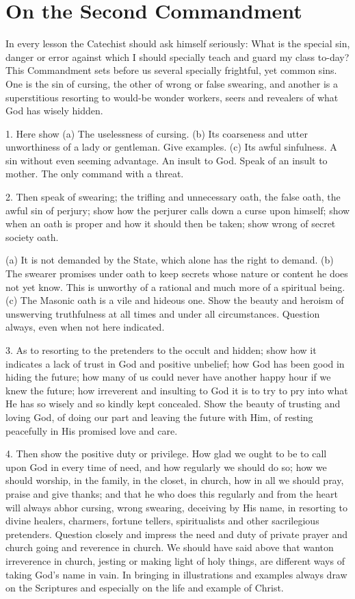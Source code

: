 \section{On the Second Commandment}

In every lesson the Catechist should ask himself seriously: What is the special sin, danger or error against which I should specially teach and guard my class to-day? This Commandment sets before us several specially frightful, yet common sins. One is the sin of cursing, the other of wrong or false swearing, and another is a superstitious resorting to would-be wonder workers, seers and revealers of what God has wisely hidden.

 1. Here show (a) The uselessness of cursing. (b) Its coarseness and utter unworthiness of a lady or gentleman. Give examples. (c) Its awful sinfulness. A sin without even seeming advantage. An insult to God. Speak of an insult to mother. The only command with a threat.

 2. Then speak of swearing; the trifling and unnecessary oath, the false oath, the awful sin of perjury; show how the perjurer calls down a curse upon himself; show when an oath is proper and how
it should then be taken; show wrong of secret society oath.

(a) It is not demanded by the State, which alone has the right to demand. (b) The swearer promises under oath to keep secrets whose nature or content he does not yet know. This is unworthy of a rational and much more of a spiritual being. (c) The Masonic oath is a vile and hideous one. Show the beauty and heroism of unswerving truthfulness at all times and under all circumstances. Question always, even when not here indicated.

 3. As to resorting to the pretenders to the occult and hidden; show how it indicates a lack of trust in God and positive unbelief; how God has been good in hiding the future; how many of us could never have another happy hour if we knew the future; how irreverent and insulting to God it is to try to pry into what He has so wisely and so kindly kept concealed. Show the beauty of trusting and loving God, of doing our part and leaving the future with Him, of resting peacefully in His promised love and care.

 4. Then show the positive duty or privilege. How glad we ought to be to call upon God in every time of need, and how regularly we should do so; how we should worship, in the family, in the closet, in church, how in all we should pray, praise and give thanks; and that he who does this regularly and
from the heart will always abhor cursing, wrong swearing, deceiving by His name, in resorting to divine healers, charmers, fortune tellers, spiritualists and other sacrilegious pretenders. Question closely and impress the need and duty of private prayer and church going and reverence in church. We should have said above that wanton irreverence in church, jesting or making light of holy things, are different ways of taking God’s name in vain. In bringing in illustrations and examples always draw on the Scriptures and especially on the life and example of Christ.

